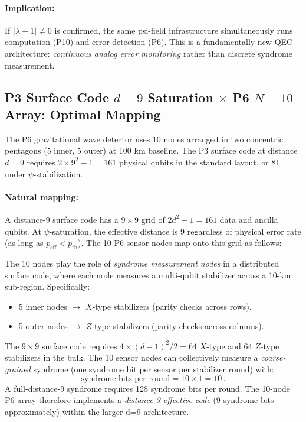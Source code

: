 \documentclass[11pt]{article}
\theoremstyle{definition}
\theoremstyle{remark}
\begin{document}
\paragraph{Implication:} If $|\lambda - 1| \neq 0$ is confirmed, the same psi-field
infrastructure simultaneously runs computation (P10) and error detection (P6).
This is a fundamentally new QEC architecture: \emph{continuous analog error
monitoring} rather than discrete syndrome measurement.

\subsection{P3 Surface Code $d=9$ Saturation $\times$ P6 $N=10$ Array: Optimal
Mapping}
\label{sec:p6-p3-map}

The P6 gravitational wave detector uses 10 nodes arranged in two concentric
pentagons (5 inner, 5 outer) at 100 km baseline. The P3 surface code at
distance $d = 9$ requires $2 \times 9^2 - 1 = 161$ physical qubits in the
standard layout, or 81 under $\psi$-stabilization.

\paragraph{Natural mapping:} A distance-9 surface code has a $9 \times 9$ grid
of $2d^2 - 1 = 161$ data and ancilla qubits. At $\psi$-saturation, the
effective distance is 9 regardless of physical error rate (as long as
$p_{\mathrm{eff}} < p_{\mathrm{th}}$). The 10 P6 sensor nodes map onto this
grid as follows:

The 10 nodes play the role of \emph{syndrome measurement nodes} in a
distributed surface code, where each node measures a multi-qubit stabilizer
across a 10-km sub-region. Specifically:
\begin{itemize}
\item 5 inner nodes $\to$ $X$-type stabilizers (parity checks across rows).
\item 5 outer nodes $\to$ $Z$-type stabilizers (parity checks across columns).
\end{itemize}
The $9 \times 9$ surface code requires $4 \times (d-1)^2/2 = 64$ $X$-type and
64 $Z$-type stabilizers in the bulk. The 10 sensor nodes can collectively
measure a \emph{coarse-grained} syndrome (one syndrome bit per sensor per
stabilizer round) with:
\begin{equation}
\text{syndrome bits per round} = 10 \times 1 = 10\,.
\end{equation}
A full-distance-9 syndrome requires 128 syndrome bits per round. The 10-node
P6 array therefore implements a \emph{distance-3 effective code} (9 syndrome
bits approximately) within the larger d=9 architecture.
\end{document}
